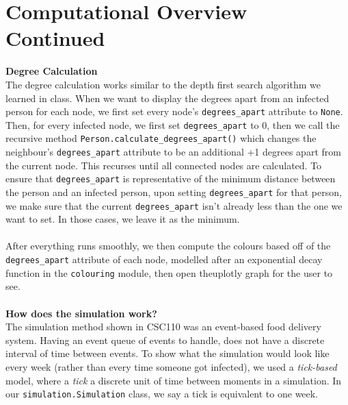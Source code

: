 \documentclass[fontsize=11pt]{article}
\newcommand{\ttt}[1]{\texttt{#1}}
\begin{document}
\section*{Computational Overview Continued}
\textbf{Degree Calculation} \\
The degree calculation works similar to the depth first search algorithm we learned in class. When we want to display the degrees apart from an infected person for each node, we first set every node's \ttt{degrees\_apart} attribute to \ttt{None}. Then, for every infected node, we first set \ttt{degrees\_apart} to 0, then we call the recursive method \ttt{Person.calculate\_degrees\_apart()} which changes the neighbour's \ttt{degrees\_apart} attribute to be an additional +1 degrees apart from the current node. This recurses until all connected nodes are calculated. To ensure that \ttt{degrees\_apart} is representative of the minimum distance between the person and an infected person, upon setting \ttt{degrees\_apart} for that person, we make sure that the current \ttt{degrees\_apart} isn't already less than the one we want to set. In those cases, we leave it as the minimum. \\ \\
After everything runs smoothly, we then compute the colours based off of the \ttt{degrees\_apart} attribute of each node, modelled after an exponential decay function in the \ttt{colouring} module, then open theuplotly graph for the user to see.
\\ \\
\textbf{How does the simulation work?} \\
The simulation method shown in CSC110 was an event-based food delivery system. Having an event queue of events to handle, does not have a discrete interval of time between events. To show what the simulation would look like every week (rather than every time someone got infected), we used a \emph{tick-based} model, where a \emph{tick} a discrete unit of time between moments in a simulation. In our \ttt{simulation.Simulation} class, we say a tick is equivalent to one week.
\\ \\
\end{document}
